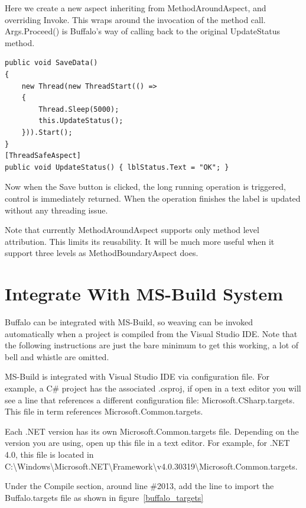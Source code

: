 Here we create a new aspect inheriting from MethodAroundAspect, and overriding Invoke. This wraps around the invocation of the method call. Args.Proceed() is Buffalo’s way of calling back to the original UpdateStatus method.

\begin{lstlisting}[caption={Apply ThreadSafeAspect}, label=savedata5, frame=tb, basicstyle=\scriptsize]
public void SaveData()
{
	new Thread(new ThreadStart(() =>
	{
		Thread.Sleep(5000);
		this.UpdateStatus();
	})).Start();
}
[ThreadSafeAspect]
public void UpdateStatus() { lblStatus.Text = "OK"; }
\end{lstlisting}

Now when the Save button is clicked, the long running operation is triggered, control is immediately returned. When the operation finishes the label is updated without any threading issue.

Note that currently MethodAroundAspect supports only method level attribution. This limits its reusability. It will be much more useful when it support three levels as MethodBoundaryAspect does.


\section{Integrate With MS-Build System}

Buffalo can be integrated with MS-Build, so weaving can be invoked automatically when a project is compiled from the Visual Studio IDE. Note that the following instructions are just the bare minimum to get this working, a lot of bell and whistle are omitted.

MS-Build is integrated with Visual Studio IDE via configuration file. For example, a C\# project has the associated .csproj, if open in a text editor you will see a line that references a different configuration file: Microsoft.CSharp.targets. This file in term references Microsoft.Common.targets.

Each .NET version has its own Microsoft.Common.targets file. Depending on the version you are using, open up this file in a text editor. For example, for .NET 4.0, this file is located in C:\textbackslash Windows\textbackslash Microsoft.NET\textbackslash Framework\textbackslash v4.0.30319\textbackslash Microsoft.Common.targets.

Under the Compile section, around line \#2013, add the line to import the Buffalo.targets file as shown in figure~\ref{buffalo_targets}

